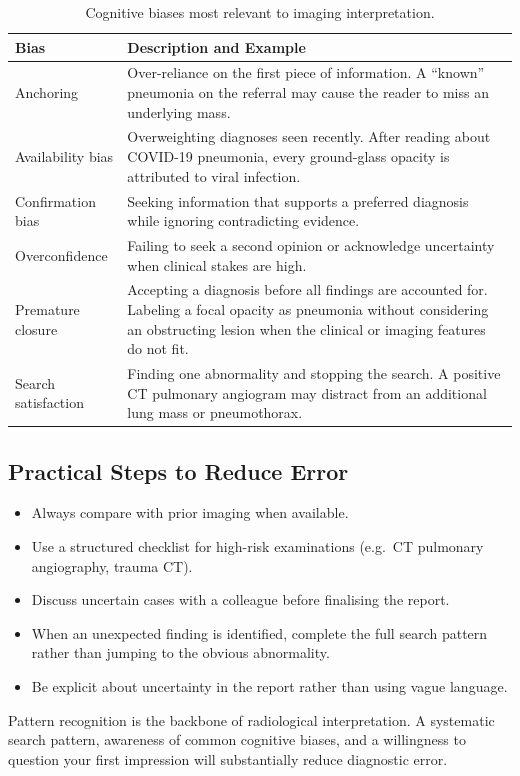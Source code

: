 \begin{table}[h]
\centering
\caption{Cognitive biases most relevant to imaging interpretation.}
\label{tab:cognitive_biases}
\begin{tabular}{p{3.5cm} p{9cm}}
\toprule
\textbf{Bias} & \textbf{Description and Example} \\
\midrule
Anchoring & Over-reliance on the first piece of information. A ``known'' pneumonia on the referral may cause the reader to miss an underlying mass. \\
Availability bias & Overweighting diagnoses seen recently. After reading about COVID-19 pneumonia, every ground-glass opacity is attributed to viral infection. \\
Confirmation bias & Seeking information that supports a preferred diagnosis while ignoring contradicting evidence. \\
Overconfidence & Failing to seek a second opinion or acknowledge uncertainty when clinical stakes are high. \\
Premature closure & Accepting a diagnosis before all findings are accounted for. Labeling a focal opacity as pneumonia without considering an obstructing lesion when the clinical or imaging features do not fit. \\
Search satisfaction & Finding one abnormality and stopping the search. A positive CT pulmonary angiogram may distract from an additional lung mass or pneumothorax. \\
\bottomrule
\end{tabular}
\end{table}

\subsection{Practical Steps to Reduce Error}
\begin{itemize}
    \item Always compare with prior imaging when available.
    \item Use a structured checklist for high-risk examinations (e.g.\ CT pulmonary angiography, trauma CT).
    \item Discuss uncertain cases with a colleague before finalising the report.
    \item When an unexpected finding is identified, complete the full search pattern rather than jumping to the obvious abnormality.
    \item Be explicit about uncertainty in the report rather than using vague language.
\end{itemize}

\begin{pearlbox}[Impression:]
Pattern recognition is the backbone of radiological interpretation. A systematic search pattern, awareness of common cognitive biases, and a willingness to question your first impression will substantially reduce diagnostic error.
\end{pearlbox}

\clearpage
